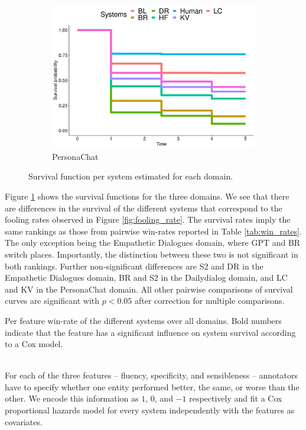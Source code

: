 \documentclass[11pt,a4paper]{article}
\begin{document}
\begin{figure}[h!]
  \begin{subfigure}[b]{0.3\textwidth}
    \includegraphics[width=\textwidth]{figures/survival/convai2_all.png}
    \caption{PersonaChat}
  \end{subfigure}
  \caption{Survival function per system estimated for each domain.}
  \label{fig:survival_all_domains}
\end{figure}

Figure \ref{fig:survival_all_domains} shows the survival functions for the three domains. We see that there are differences in the survival of the different systems that correspond to the fooling rates observed in Figure \ref{fig:fooling_rate}. The survival rates imply the same rankings as those from pairwise win-rates reported in Table \ref{tab:win_rates}. The only exception being the Empathetic Dialogues domain, where GPT and BR switch places. Importantly, the distinction between these two is not significant in both rankings. Further non-significant differences are S2 and DR in the Empathetic Dialogues domain, BR and S2 in the Dailydialog domain, and LC and KV in the PersonaChat domain. All other pairwise comparisons of survival curves are significant with $p  < 0.05$ after correction for multiple comparisons.
\begin{table}[ht]
    \centering
    \small
    
    \caption{Per feature win-rate of the different systems over all domains. Bold numbers indicate that the feature has a significant
    influence on system survival according to a Cox model.}
    \label{tab:survival_features}
\end{table}
\\
 For each of the three features -- fluency, specificity, and sensibleness -- annotators have to specify whether one entity performed better, the same, or worse than the other. We encode this information as $1$, $0$, and $-1$ respectively and fit a Cox proportional hazards model for every system independently with the features as covariates.
\end{document}
